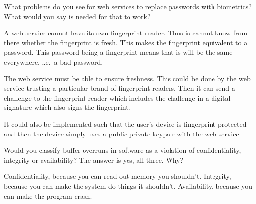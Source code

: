 \question[3]
  What problems do you see for web services to replace passwords with 
  biometrics?
  What would you say is needed for that to work?

  \begin{solution}
    A web service cannot have its own fingerprint reader.
    Thus is cannot know from there whether the fingerprint is fresh.
    This makes the fingerprint equivalent to a password.
    This password being a fingerprint means that is will be the same 
    everywhere, i.e.\ a bad password.

    The web service must be able to ensure freshness.
    This could be done by the web service trusting a particular brand of 
    fingerprint readers.
    Then it can send a challenge to the fingerprint reader which includes the 
    challenge in a digital signature which also signs the fingerprint.

    It could also be implemented such that the user's device is fingerprint 
    protected and then the device simply uses a public-private keypair with the 
    web service.
  \end{solution}


  
\question[3]
Would you classify buffer overruns in software as a violation of 
confidentiality, integrity or availability?
The answer is yes, all three.
Why?

\begin{solution}
  Confidentiality, because you can read out memory you shouldn't.
  Integrity, because you can make the system do things it shouldn't.
  Availability, because you can make the program crash.
\end{solution}


